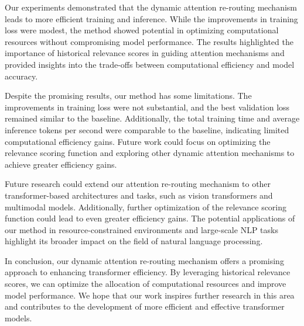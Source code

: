 \documentclass{article} %
\begin{document}
Our experiments demonstrated that the dynamic attention re-routing mechanism leads to more efficient training and inference. While the improvements in training loss were modest, the method showed potential in optimizing computational resources without compromising model performance. The results highlighted the importance of historical relevance scores in guiding attention mechanisms and provided insights into the trade-offs between computational efficiency and model accuracy.

Despite the promising results, our method has some limitations. The improvements in training loss were not substantial, and the best validation loss remained similar to the baseline. Additionally, the total training time and average inference tokens per second were comparable to the baseline, indicating limited computational efficiency gains. Future work could focus on optimizing the relevance scoring function and exploring other dynamic attention mechanisms to achieve greater efficiency gains.

Future research could extend our attention re-routing mechanism to other transformer-based architectures and tasks, such as vision transformers and multimodal models. Additionally, further optimization of the relevance scoring function could lead to even greater efficiency gains. The potential applications of our method in resource-constrained environments and large-scale NLP tasks highlight its broader impact on the field of natural language processing.

In conclusion, our dynamic attention re-routing mechanism offers a promising approach to enhancing transformer efficiency. By leveraging historical relevance scores, we can optimize the allocation of computational resources and improve model performance. We hope that our work inspires further research in this area and contributes to the development of more efficient and effective transformer models.



\end{document}

